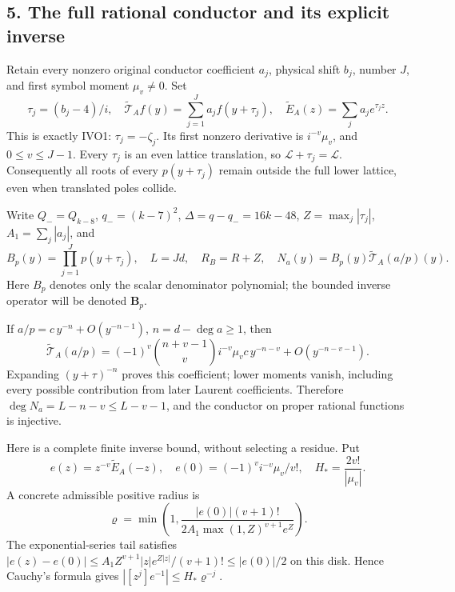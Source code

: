 \documentclass[11pt]{article}
\begin{document}
\subsection{5. The full rational conductor and its explicit inverse}\label{the-full-rational-conductor-and-its-explicit-inverse}

Retain every nonzero original conductor coefficient \(a_j\), physical shift \(b_j\), number \(J\), and first symbol moment \(\mu_v\ne0\). Set \[
\tau_j=(b_j-4)/i,\quad
\widetilde{\mathcal T}_Af(y)=\sum_{j=1}^Ja_jf(y+\tau_j),
\quad \widetilde E_A(z)=\sum_ja_je^{\tau_jz}.
\tag{RF21}
\] This is exactly IVO1: \(\tau_j=-\zeta_j\). Its first nonzero derivative is \(i^{-v}\mu_v\), and \(0\le v\le J-1\). Every \(\tau_j\) is an even lattice translation, so \(\mathscr L+\tau_j=\mathscr L\). Consequently all roots of every \(p(y+\tau_j)\) remain outside the full lower lattice, even when translated poles collide.

Write \(Q_-=Q_{k-8}\), \(q_-=(k-7)^2\), \(\Delta=q-q_-=16k-48\), \(Z=\max_j|\tau_j|\), \(A_1=\sum_j|a_j|\), and \[
B_p(y)=\prod_{j=1}^Jp(y+\tau_j),\quad L=Jd,\quad R_B=R+Z,
\quad N_a(y)=B_p(y)\widetilde{\mathcal T}_A(a/p)(y).
\tag{RF22}
\] Here \(B_p\) denotes only the scalar denominator polynomial; the bounded inverse operator will be denoted \(\mathbf B_p\).

If \(a/p=c\,y^{-n}+O(y^{-n-1})\), \(n=d-\deg a\ge1\), then \[
\widetilde{\mathcal T}_A(a/p)
=(-1)^v\binom{n+v-1}{v}i^{-v}\mu_v c\,y^{-n-v}
+O(y^{-n-v-1}).
\tag{RF23}
\] Expanding \((y+\tau)^{-n}\) proves this coefficient; lower moments vanish, including every possible contribution from later Laurent coefficients. Therefore \(\deg N_a=L-n-v\le L-v-1\), and the conductor on proper rational functions is injective.

Here is a complete finite inverse bound, without selecting a residue. Put \[
e(z)=z^{-v}\widetilde E_A(-z),\quad e(0)=(-1)^vi^{-v}\mu_v/v!,
\quad H_*=\frac{2v!}{|\mu_v|}.
\] A concrete admissible positive radius is \[
\varrho=\min\left(1,\frac{|e(0)|(v+1)!}
 {2A_1\max(1,Z)^{v+1}e^Z}\right).
\tag{RF24}
\] The exponential-series tail satisfies \(|e(z)-e(0)|\le A_1Z^{v+1}|z|e^{Z|z|}/(v+1)!\le|e(0)|/2\) on this disk. Hence Cauchy's formula gives \(|[z^j]e^{-1}|\le H_*\varrho^{-j}\).
\end{document}
